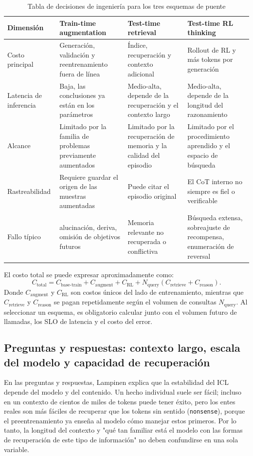 \documentclass[a4paper]{article}
\begin{document}
\begin{table}[H]
\centering
\small
\caption{Tabla de decisiones de ingeniería para los tres esquemas de puente}
\begin{tabularx}{\textwidth}{L{0.18\textwidth}X X X}
\toprule
Dimensión & Train-time augmentation & Test-time retrieval & Test-time RL thinking \\
\midrule
Costo principal & Generación, validación y reentrenamiento fuera de línea & Índice, recuperación y contexto adicional & Rollout de RL y más tokens por generación \\
Latencia de inferencia & Baja, las conclusiones ya están en los parámetros & Medio-alta, depende de la recuperación y el contexto largo & Medio-alta, depende de la longitud del razonamiento \\
Alcance & Limitado por la familia de problemas previamente aumentados & Limitado por la recuperación de memoria y la calidad del episodio & Limitado por el procedimiento aprendido y el espacio de búsqueda \\
Rastreabilidad & Requiere guardar el origen de las muestras aumentadas & Puede citar el episodio original & El CoT interno no siempre es fiel o verificable \\
Fallo típico & alucinación, deriva, omisión de objetivos futuros & Memoria relevante no recuperada o conflictiva & Búsqueda extensa, sobreajuste de recompensa, enumeración de reversal \\
\bottomrule
\end{tabularx}
\end{table}

El costo total se puede expresar aproximadamente como:
$$
C_{\text{total}}=
C_{\text{base-train}}+C_{\text{augment}}+C_{\text{RL}}
+N_{\text{query}}\left(C_{\text{retrieve}}+C_{\text{reason}}\right).
$$
Donde $C_{\text{augment}}$ y $C_{\text{RL}}$ son costos únicos del lado de entrenamiento, mientras que $C_{\text{retrieve}}$ y $C_{\text{reason}}$ se pagan repetidamente según el volumen de consultas $N_{\text{query}}$. Al seleccionar un esquema, es obligatorio calcular junto con el volumen futuro de llamadas, los SLO de latencia y el costo del error.

\subsection{Preguntas y respuestas: contexto largo, escala del modelo y capacidad de recuperación}

En las preguntas y respuestas, Lampinen explica que la estabilidad del ICL depende del modelo y del contenido. Un hecho individual suele ser fácil; incluso en un contexto de cientos de miles de tokens puede tener éxito, pero los entes reales son más fáciles de recuperar que los tokens sin sentido (\texttt{nonsense}), porque el preentrenamiento ya enseña al modelo cómo manejar estos primeros. Por lo tanto, la longitud del contexto y "qué tan familiar está el modelo con las formas de recuperación de este tipo de información" no deben confundirse en una sola variable.
\end{document}
